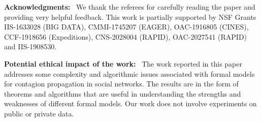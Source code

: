 \documentclass[letterpaper]{article} %
\begin{document}








%



%



% 

%



\clearpage


%
\noindent
\textbf{Acknowledgments:}~
We thank the referees for carefully reading
the paper and providing very helpful feedback.
This work is partially supported by NSF Grants  
IIS-1633028 (BIG DATA),
CMMI-1745207 (EAGER),
OAC-1916805 (CINES),
CCF-1918656 (Expeditions),
CNS-2028004 (RAPID),
OAC-2027541 (RAPID) and
IIS-1908530.

\bigskip

\noindent
\textbf{Potential ethical impact of the work:}~ 
The work reported in this paper addresses some complexity and algorithmic
issues associated with formal models for contagion
propagation in social networks.
The results are in the form of theorems and algorithms
that are useful in understanding the strengths and
weaknesses of different formal models.
Our work does not involve experiments on public or private data.

\bigskip


\end{document}

